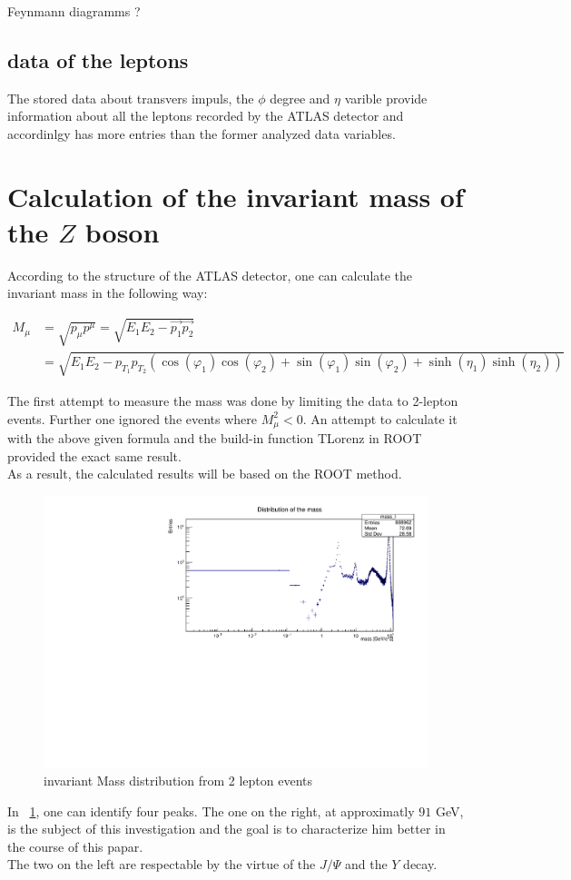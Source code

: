 \documentclass[12pt, a4paper, bibliography=totoc]{scrreprt}
\begin{document}
Feynmann diagramms ?

\subsection{data of the leptons}
The stored data about transvers impuls, the $\phi$ degree and $\eta$ varible provide information about all the leptons recorded by the ATLAS detector and accordinlgy has more entries than the former analyzed data variables.

\section{Calculation of the invariant mass of the $Z$ boson}
According to the structure of the ATLAS detector, one can calculate the invariant mass in the following way:

\begin{align}
	M_{\mu} &= \sqrt{p_{\mu}p^{\mu}} = \sqrt{E_{1}E_{2}-\vec{p_{1}}\vec{p_{2}}}\\
			&= \sqrt{E_{1}E_{2}-p_{T_{1}}p_{T_{2}} (\cos(\varphi_{1})\cos(\varphi_{2})+\sin(\varphi_{1})\sin(\varphi_{2})+\sinh(\eta_{1})\sinh(\eta_{2}))}
\end{align}

The first attempt to measure the mass was done by limiting the data to 2-lepton events. Further one ignored the events where $M_{\mu}^{2} < 0$. An attempt to calculate it with the above given formula and the build-in function TLorenz in ROOT provided the exact same result.\\
As a result, the calculated results will be based on the ROOT method.

\begin{figure}[h]
	\centering
	\includegraphics[scale=0.5]{fig/mass_lz_log.pdf}
	\caption{invariant Mass distribution from 2 lepton events}
	\label{mass_lz_log}
\end{figure}

In ~\ref{mass_lz_log}, one can identify four peaks. The one on the right, at approximatly $91$ GeV, is the subject of this investigation and the goal is to characterize him better in the course of this papar.\\
The two on the left are respectable by the virtue of the $J/{\Psi}$ and the $Y$ decay. 

\nocite{*}
\appendix
\printbibliography
\end{document}

